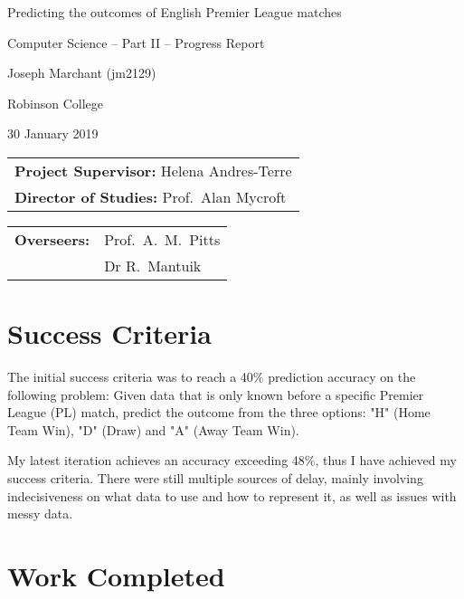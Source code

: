 \documentclass[12pt,a4paper,twoside]{article}
\begin{document}
\centerline{\large Predicting the outcomes of English Premier League matches}
\centerline{\large Computer Science -- Part II -- Progress Report}
\vspace{0.2in}

\centerline{Joseph Marchant (jm2129)}
\centerline{Robinson College}
\centerline{30 January 2019}

\vspace{0.2in}


\begin{tabular}[t]{@{}l}
{\bf Project Supervisor:} Helena Andres-Terre\\[3mm]
{\bf Director of Studies:} Prof.\ Alan Mycroft
\end{tabular}
\hfill
\begin{tabular}[t]{@{}l @{}l}
{\bf Overseers: } & Prof.\ A.\ M.\ Pitts \\[3mm]
& Dr R.\ Mantuik
\end{tabular}


\section*{Success Criteria}

The initial success criteria was to reach a 40\% prediction accuracy on the following problem: Given data that is only known before a specific Premier League (PL) match, predict the outcome from the three options: "H" (Home Team Win), "D" (Draw) and "A" (Away Team Win).

My latest iteration achieves an accuracy exceeding 48\%, thus I have achieved my success criteria. There were still multiple sources of delay, mainly involving indecisiveness on what data to use and how to represent it, as well as issues with messy data.

\section*{Work Completed}
\end{document}
